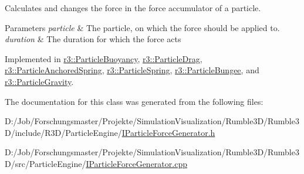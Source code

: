 Calculates and changes the force in the force accumulator of a particle. 


\begin{DoxyParams}{Parameters}
{\em particle} & The particle, on which the force should be applied to. \\
\hline
{\em duration} & The duration for which the force acts \\
\hline
\end{DoxyParams}


Implemented in \mbox{\hyperlink{classr3_1_1_particle_buoyancy_ad1249e51508770fd9b1775c8e22eb51a}{r3\+::\+Particle\+Buoyancy}}, \mbox{\hyperlink{classr3_1_1_particle_drag_abbfc4f053bb921be0068f8928c300384}{r3\+::\+Particle\+Drag}}, \mbox{\hyperlink{classr3_1_1_particle_anchored_spring_aa445db9e0efcc25a422348f4e580ed7f}{r3\+::\+Particle\+Anchored\+Spring}}, \mbox{\hyperlink{classr3_1_1_particle_spring_a113e7bdf36d5edf020abecec5a0fb730}{r3\+::\+Particle\+Spring}}, \mbox{\hyperlink{classr3_1_1_particle_bungee_a04de21f7e418f572a9c9dfc936384b96}{r3\+::\+Particle\+Bungee}}, and \mbox{\hyperlink{classr3_1_1_particle_gravity_a9535686bf25375d94bbe0451c089b788}{r3\+::\+Particle\+Gravity}}.



The documentation for this class was generated from the following files\+:\begin{DoxyCompactItemize}
\item 
D\+:/\+Job/\+Forschungsmaster/\+Projekte/\+Simulation\+Visualization/\+Rumble3\+D/\+Rumble3\+D/include/\+R3\+D/\+Particle\+Engine/\mbox{\hyperlink{_i_particle_force_generator_8h}{I\+Particle\+Force\+Generator.\+h}}\item 
D\+:/\+Job/\+Forschungsmaster/\+Projekte/\+Simulation\+Visualization/\+Rumble3\+D/\+Rumble3\+D/src/\+Particle\+Engine/\mbox{\hyperlink{_i_particle_force_generator_8cpp}{I\+Particle\+Force\+Generator.\+cpp}}\end{DoxyCompactItemize}
